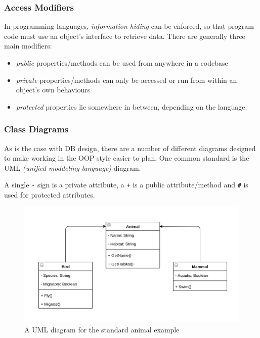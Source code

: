 \documentclass[9pt]{article}
\begin{document}
\subsubsection{Access Modifiers}
\label{sec:orgd7d8a96}

In programming languages, \emph{information hiding} can be enforced, so that program code must use an object's interface to retrieve data. There are generally three main modifiers:

\begin{itemize}
\item \emph{public} properties/methods can be used from anywhere in a codebase
\item \emph{private} properties/methods can only be accessed or run from within an object's own behaviours
\item \emph{protected} properties lie somewhere in between, depending on the language.
\end{itemize}

\subsubsection{Class Diagrams}
\label{sec:org31d912f}

As is the case with DB design, there are a number of different diagrams designed to make working in the OOP style easier to plan. One common standard is the UML \emph{(unified moddeling language)} diagram.

A single \texttt{-} sign is a private attribute, a \texttt{+} is a public attribute/method and \texttt{\#} is used for protected attributes.

\begin{figure}[htbp]
\centering
\includegraphics[width=.9\linewidth]{./images/uml.png}
\caption{A UML diagram for the standard animal example}
\end{figure}
\end{document}
